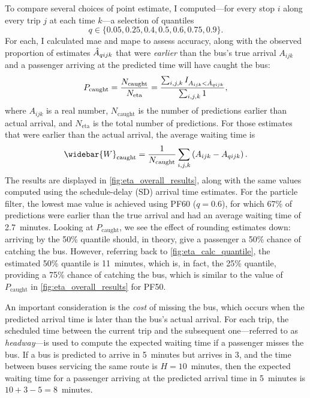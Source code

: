 To compare several choices of point estimate, I computed---for every stop $i$ along every trip $j$ at each time $k$---a selection of quantiles
\[
  q \in \{0.05, 0.25, 0.4, 0.5, 0.6, 0.75, 0.9\}.
\]
For each, I calculated \gls{mae} and \gls{mape} to assess accuracy, along with the observed proportion of estimates $\hat{A}_{qijk}$ that were \emph{earlier} than the bus's true arrival $A_{ijk}$ and a passenger arriving at the predicted time will have caught the bus:
\begin{equation}
\label{eq:pr_bus_caught}
P_\text{caught} = \frac{N_\text{caught}}{N_\text{eta}}
= \frac{\sum_{i,j,k} I_{A_{ijk} < \hat{A}_{qijk}}}{\sum_{i,j,k} 1},
\end{equation}
where $A_{ijk}$ is a real number, $N_\text{caught}$ is the number of predictions earlier than actual arrival, and $N_\text{eta}$ is the total number of predictions. For those estimates that were earlier than the actual arrival, the average waiting time is
\begin{equation}
\label{eq:avg_wait_time}
\widebar{W}_\text{caught} =
\frac{1}{N_\text{caught}} \sum_{i,j,k} \left(A_{ijk} - \Teta_{qijk}\right).
\end{equation}
The results are displayed in \cref{fig:eta_overall_results}, along with the same values computed using the schedule-delay (SD) arrival time estimates. For the particle filter, the lowest \gls{mae} value is achieved using PF60 ($q = 0.6$), for which 67\% of predictions were earlier than the true arrival and had an average waiting time of 2.7~minutes. Looking at $P_\text{caught}$, we see the effect of rounding estimates down: arriving by the 50\% quantile should, in theory, give a passenger a 50\% chance of catching the bus. However, referring back to \cref{fig:eta_calc_quantile}, the estimated 50\% quantile is 11~minutes, which is, in fact, the 25\% quantile, providing a 75\% chance of catching the bus, which is similar to the value of $P_\text{caught}$ in \cref{fig:eta_overall_results} for PF50.



An important consideration is the \emph{cost} of missing the bus, which occurs when the predicted arrival time is later than the bus's actual arrival. For each trip, the scheduled time between the current trip and the subsequent one---referred to as \emph{headway}---is used to compute the expected waiting time if a passenger misses the bus. If a bus is predicted to arrive in 5~minutes but arrives in 3, and the time between buses servicing the same route is $H = 10$~minutes, then the expected waiting time for a passenger arriving at the predicted arrival time in 5~minutes is $10+3-5=8$~minutes.



